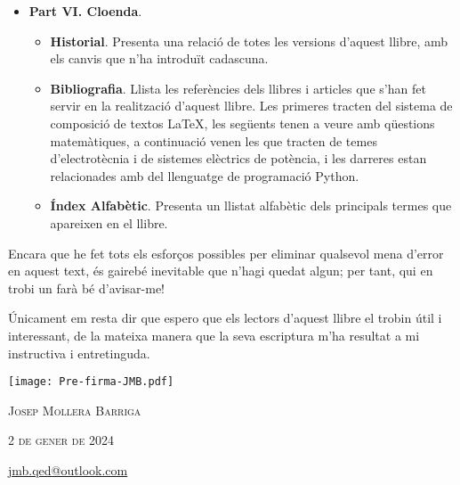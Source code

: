 \begin{itemize}
\begin{itemize}
		\end{itemize}
		\item \textbf{Part VI. Cloenda}.
		\begin{itemize}
			\item \textbf{Historial}. Presenta una relació de totes les versions d'aquest llibre, amb els canvis que n'ha introduït cadascuna.
			\item \textbf{Bibliografia}. Llista les referències dels  llibres i articles que s'han fet servir en la realització d'aquest llibre. Les primeres  tracten del sistema de composició de textos \LaTeX, les següents tenen a veure amb qüestions matemàtiques, a continuació venen les que tracten de temes d'electrotècnia i de sistemes elèctrics de potència,  i les darreres estan relacionades amb  del llenguatge de programació Python.
			\item \textbf{Índex Alfabètic}. Presenta un llistat alfabètic dels principals termes que apareixen en el llibre.
		\end{itemize}
	\end{itemize}
		

    Encara que he fet tots els esforços possibles per eliminar qualsevol
    mena  d'error en aquest text, és gairebé inevitable que n'hagi quedat algun;  per tant, qui en trobi un  farà bé d'avisar-me!


   Únicament em resta dir que espero que els lectors d'aquest llibre el trobin    útil i interessant, de la mateixa manera que la seva escriptura m'ha resultat  a mi instructiva i entretinguda.


\hfill
\begin{minipage}[b]{30mm}
    \texttt{[image: Pre-firma-JMB.pdf]}
\end{minipage}

{\large

    \hfill \textsc{Josep Mollera Barriga} 

    \hfill \textsc{2 de gener de 2024} 

    \hfill {\small \href{mailto:jmb.qed@outlook.com}{\faEnvelope\hspace{2mm}jmb.qed@outlook.com} }

}
